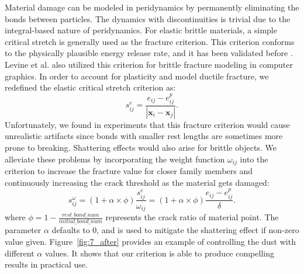 Material damage can be modeled in peridynamics by permanently eliminating the bonds between particles. The dynamics with discontinuities is trivial due to the integral-based nature of peridynamics. For elastic brittle materials, a simple critical stretch is generally used as the fracture criterion. This criterion conforms to the physically plausible energy release rate, and it has been validated before \cite{Silling2005}. Levine et al.\cite{Levine:2015:PPS:2849517.2849526} also utilized this criterion for brittle fracture modeling in computer graphics. In order to account for plasticity and model ductile fracture, we redefined the elastic critical stretch criterion as:
\begin{equation}
s_{ij}^e =\frac{e_{ij}-e_{ij}^p}{|\mathbf{x}_i-\mathbf{x}_j|}.
\label{eq:17}
\end{equation}
Unfortunately, we found in experiments that this fracture criterion would cause unrealistic artifacts since bonds with smaller rest lengths are sometimes more prone to breaking. 
Shattering effects would also arise for brittle objects.
We alleviate these problems by incorporating the weight function $\omega_{ij}$ into the criterion to increase the fracture value for closer family members  
and continuously increasing the crack threshold as the material gets damaged:
\begin{equation}
s_{ij}^\omega = (1 + \alpha\times\phi)\frac{s_{ij}^e}{\omega_{ij}} = (1 + \alpha\times\phi)\frac{e_{ij}-e_{ij}^p}{\delta}.
\label{eq:18}
\end{equation}
where $\phi = 1 - \frac{rest\_bond\_num}{initial\_bond\_num}$ represents the crack ratio of material point.
The parameter $\alpha$ defaults to 0, and is used to mitigate the shattering effect if non-zero value given.
Figure~\ref{fig:7_after} provides an example of controlling the dust with different $\alpha$ values.
It shows that our criterion is able to produce compelling results in practical use.

